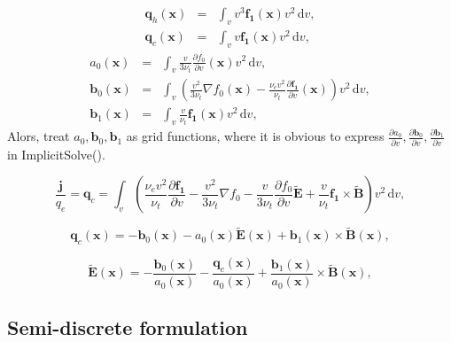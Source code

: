 \documentclass[preprint,12pt]{elsarticle}
\newcommand{\pdv}[2]{\frac{\partial{#1}}{\partial{#2}}}
\newcommand{\vect}[1]{\boldsymbol{#1}}
\newcommand{\dI}{\text{d}}
\newcommand{\nue}{\nu_{e}}
\newcommand{\nutot}{\nu_{t}}
\newcommand{\vmag}{v}
\newcommand{\tE}{\vect{\tilde{E}}}
\newcommand{\tB}{\vect{\tilde{B}}}
\newcommand{\qe}{q_e}
\newcommand{\fzero}{f_0}
\newcommand{\fone}{\vect{f_1}}
\newcommand{\intv}{\int_{\vmag}}
\newcounter{bla}
\begin{document}
\begin{eqnarray}
  \vect{q}_h(\vect{x}) &=& \intv
  \vmag^3 \fone(\vect{x}) \vmag^2\, \dI\vmag , \nonumber \\
  \vect{q}_c(\vect{x}) &=& \intv
  \vmag\fone(\vect{x}) \vmag^2\, \dI\vmag , \nonumber 
\end{eqnarray}
\begin{eqnarray}
  a_0(\vect{x}) &=& \intv\frac{\vmag}{3 \nutot} \pdv{\fzero}{\vmag}(\vect{x})
  \vmag^2\, \dI\vmag , \nonumber \\
  \vect{b}_{0}(\vect{x}) &=& \intv\left(  
  \frac{\vmag^2}{3 \nutot}\nabla\fzero(\vect{x})
  - \frac{\nue\vmag^2}{\nutot}\pdv{\fone}{\vmag}(\vect{x})
  \right)\vmag^2\, \dI\vmag , \nonumber \\
  \vect{b}_{1}(\vect{x}) &=& \intv
  \frac{\vmag}{\nutot}\fone(\vect{x})
  \vmag^2\, \dI\vmag , \nonumber
\end{eqnarray}
Alors, treat $a_0, \vect{b}_{0}, \vect{b}_1$ as grid functions, 
where it is obvious to express 
$\pdv{a_0}{\vmag}, \pdv{\vect{b}_{0}}{\vmag}, \pdv{\vect{b}_1}{\vmag}$ in 
ImplicitSolve().

\begin{equation}
  \frac{\vect{j}}{\qe} = \vect{q}_c =
  \intv \left(\frac{\nue\vmag^2}{\nutot}\pdv{\fone}{\vmag}
  - \frac{\vmag^2}{3\nutot}\nabla\fzero - 
  \frac{\vmag}{3\nutot}\pdv{\fzero}{\vmag}\tE
   + \frac{\vmag}{\nutot}\fone\times\tB\right) \vmag^2\, \dI\vmag ,
  \label{eq:HOFcurrent}
\end{equation}

\begin{equation}
  \vect{q}_c(\vect{x}) 
  = -\vect{b}_{0}(\vect{x}) 
  - a_{0}(\vect{x})\tE(\vect{x})
   + \vect{b}_{1}(\vect{x})\times\tB(\vect{x}) ,
  \label{eq:HOFcurrent}
\end{equation}

\begin{equation}
  \tE(\vect{x}) = -\frac{\vect{b}_{0}(\vect{x})}{a_{0}(\vect{x})} 
  - \frac{\vect{q}_c(\vect{x})}{a_{0}(\vect{x})}
   + \frac{\vect{b}_{1}(\vect{x})}{a_{0}(\vect{x})}\times\tB(\vect{x}) ,
  \label{eq:HOFcurrent}
\end{equation}

\subsection{Semi-discrete formulation}\label{sec:semidiscrete_form}
\end{document}
